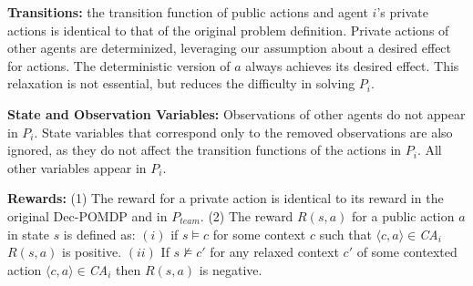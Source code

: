\documentclass[runningheads]{llncs}
\newcommand{\cact}[1]{{\em CA$_#1$}}
\begin{document}
{\bf Transitions:} the transition function of public actions and agent $i$'s private actions is identical to that of the original problem definition.
Private actions of other agents are determinized,
leveraging our assumption about a desired effect for
actions. The deterministic version of $a$ always achieves its desired effect. This relaxation is not essential, but reduces the difficulty in solving $P_i$. 


{\bf State and Observation Variables:} Observations of other agents do not appear in $P_i$. State variables that correspond only to the removed observations are also ignored, as they do not affect the transition functions of the actions in $P_i$. All other variables appear in $P_i$.

{\bf Rewards:} 
(1) The reward for a private action is identical to its reward in the original Dec-POMDP and in $P_{team}$. 
(2) The reward $R(s,a)$ for a public action $a$ in state $s$ is defined as: $(i)$ if $s\models c$ for some context $c$ such that $\langle c,a\rangle\in$\cact{i} $R(s,a)$ is positive. $(ii)$ If $s\not\models c'$ for any relaxed context $c'$ of some contexted action $\langle c,a\rangle\in$\cact{i} then $R(s,a)$ is negative.

\end{document}
